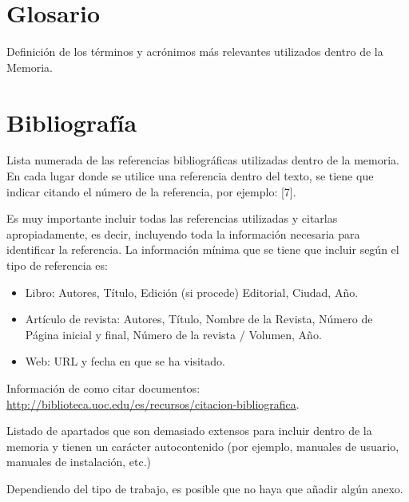 \documentclass[IB]{TFUOC}%
\begin{document}


\chapter{Glosario}

Definición de los términos y acrónimos más relevantes utilizados dentro de la Memoria.


\chapter{Bibliografía}

Lista numerada de las referencias bibliográficas utilizadas dentro de la memoria. En cada lugar donde se utilice una referencia dentro del texto, se tiene que indicar citando el número de la referencia, por ejemplo: [7].

Es muy importante incluir todas las referencias utilizadas y citarlas apropiadamente, es decir, incluyendo toda la información necesaria para identificar la referencia. La información mínima que se tiene que incluir según el tipo de referencia es:

\begin{itemize}
\item Libro: Autores, Título, Edición (si procede) Editorial, Ciudad, Año.
\item  Artículo de revista: Autores, Título, Nombre de la Revista, Número de Página inicial y final, Número de la revista / Volumen, Año.
\item  Web: URL y fecha en que se ha visitado.
\end{itemize}

Información de como citar documentos: \url{http://biblioteca.uoc.edu/es/recursos/citacion-bibliografica}.


\newpage
\appendix
Listado de apartados que son demasiado extensos para incluir dentro de la memoria y tienen un carácter autocontenido (por ejemplo, manuales de usuario, manuales de instalación, etc.)
 
Dependiendo del tipo de trabajo, es posible que no haya que añadir algún anexo.
\end{document}
